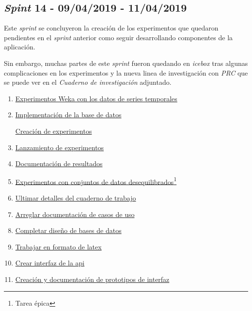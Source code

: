 \subsection{\textit{Spint} 14 - 09/04/2019 - 11/04/2019 }
Este \textit{sprint} se concluyeron la creación de los experimentos que quedaron pendientes en el \textit{sprint} anterior como seguir desarrollando componentes de la aplicación. 

Sin embargo, muchas partes de este \textit{sprint} fueron quedando en \textit{icebox} tras algunas complicaciones en los experimentos y la nueva linea de investigación con \textit{PRC} que se puede ver en el \textit{Cuaderno de investigación} adjuntado. 

\begin{enumerate}\addtocounter{enumi}{50}
	\item
	\href{https://github.com/jlgarridol/TFG-SmartBeds/issues/51}{Experimentos Weka con los datos de series temporales}
	\addtocounter{enumi}{3}
	\item
	\href{https://github.com/jlgarridol/TFG-SmartBeds/issues/55}{Implementación de la base de datos}
	\addtocounter{enumi}{2}
	\href{https://github.com/jlgarridol/TFG-SmartBeds/issues/58}{Creación de experimentos}
	\item
	\href{https://github.com/jlgarridol/TFG-SmartBeds/issues/59}{Lanzamiento de experimentos}
	\item
	\href{https://github.com/jlgarridol/TFG-SmartBeds/issues/60}{Documentación de resultados}
	\item
	\href{https://github.com/jlgarridol/TFG-SmartBeds/issues/61}{Experimentos con conjuntos de datos desequilibrados\footnote{Tarea épica}}
	\item
	\href{https://github.com/jlgarridol/TFG-SmartBeds/issues/62}{Ultimar detalles del cuaderno de trabajo}
	\item
	\href{https://github.com/jlgarridol/TFG-SmartBeds/issues/63}{Arreglar documentación de casos de uso}
	\item
	\href{https://github.com/jlgarridol/TFG-SmartBeds/issues/64}{Completar diseño de bases de datos}
	\item
	\href{https://github.com/jlgarridol/TFG-SmartBeds/issues/65}{Trabajar en formato de latex}
	\item 
	\href{https://github.com/jlgarridol/TFG-SmartBeds/issues/66}{Crear interfaz de la api}
	\item 
	\href{https://github.com/jlgarridol/TFG-SmartBeds/issues/67}{Creación y documentación de prototipos de interfaz}
\end{enumerate}

